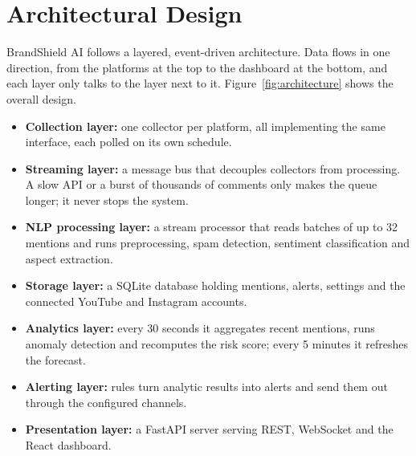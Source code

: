 \documentclass[12pt,a4paper]{report}
\begin{document}
\section{Architectural Design}

BrandShield AI follows a layered, event-driven architecture. Data flows in one direction, from the platforms at the top to the dashboard at the bottom, and each layer only talks to the layer next to it. Figure~\ref{fig:architecture} shows the overall design.

\begin{itemize}
    \item \textbf{Collection layer:} one collector per platform, all implementing the same interface, each polled on its own schedule.
    \item \textbf{Streaming layer:} a message bus that decouples collectors from processing. A slow API or a burst of thousands of comments only makes the queue longer; it never stops the system.
    \item \textbf{NLP processing layer:} a stream processor that reads batches of up to 32 mentions and runs preprocessing, spam detection, sentiment classification and aspect extraction.
    \item \textbf{Storage layer:} a SQLite database holding mentions, alerts, settings and the connected YouTube and Instagram accounts.
    \item \textbf{Analytics layer:} every 30 seconds it aggregates recent mentions, runs anomaly detection and recomputes the risk score; every 5 minutes it refreshes the forecast.
    \item \textbf{Alerting layer:} rules turn analytic results into alerts and send them out through the configured channels.
    \item \textbf{Presentation layer:} a FastAPI server serving REST, WebSocket and the React dashboard.
\end{itemize}
\end{document}

